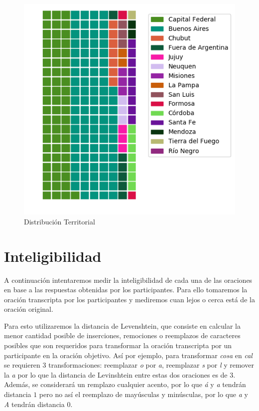 \begin{figure}
\begin{center}
\includegraphics[scale=0.8]{datosDemograficos/infancia.png}
\end{center}
\caption{Distribución Territorial}
\label{distTerritorial}
\end{figure}

\section{Inteligibilidad}

A continuación intentaremos medir la inteligibilidad de cada una de las oraciones en base a las respuestas obtenidas por los participantes. Para ello tomaremos la oración transcripta por los participantes y mediremos cuan lejos o cerca está de la oración original. 

Para esto utilizaremos la distancia de Levenshtein, que consiste en calcular la menor cantidad posible de inserciones, remociones o reemplazos de caracteres posibles que son requeridos para transformar la oración transcripta por un participante en la oración objetivo. Así por ejemplo, para transformar \textit{cosa} en \textit{cal} se requieren $3$ transformaciones: reemplazar \textit{o} por \textit{a}, reemplazar \textit{s} por \textit{l} y remover la \textit{a} por lo que la distancia de Levinshtein entre estas dos oraciones es de $3$. Además, se considerará un remplazo cualquier acento, por lo que \textit{á} y \textit{a} tendrán distancia $1$ pero no así el reemplazo de mayúsculas y minúsculas, por lo que \textit{a} y \textit{A} tendrán distancia $0$.

